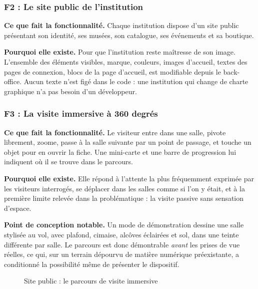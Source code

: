 \subsubsection{F2 : Le site public de l'institution}

\textbf{Ce que fait la fonctionnalité.} Chaque institution dispose d'un site
public présentant son identité, ses musées, son catalogue, ses événements et sa
boutique.

\textbf{Pourquoi elle existe.} Pour que l'institution reste maîtresse de son
image. L'ensemble des éléments visibles, marque, couleurs, images d'accueil,
textes des pages de connexion, blocs de la page d'accueil, est modifiable
depuis le back-office. Aucun texte n'est figé dans le code : une institution qui
change de charte graphique n'a pas besoin d'un développeur.

\subsubsection{F3 : La visite immersive à 360 degrés}

\textbf{Ce que fait la fonctionnalité.} Le visiteur entre dans une salle,
pivote librement, zoome, passe à la salle suivante par un point de passage, et
touche un objet pour en ouvrir la fiche. Une mini-carte et une barre de
progression lui indiquent où il se trouve dans le parcours.

\textbf{Pourquoi elle existe.} Elle répond à l'attente la plus fréquemment
exprimée par les visiteurs interrogés, se déplacer dans les salles comme si
l'on y était, et à la première limite relevée dans la problématique : la visite
passive sans sensation d'espace.

\textbf{Point de conception notable.} Un mode de démonstration dessine une salle
stylisée au vol, avec plafond, cimaise, alcôves éclairées et sol, dans une
teinte différente par salle. Le parcours est donc démontrable \emph{avant} les
prises de vue réelles, ce qui, sur un terrain dépourvu de matière numérique
préexistante, a conditionné la possibilité même de présenter le dispositif.

\begin{figure}[htbp]
\centering
{}
\caption{Site public : le parcours de visite immersive}
\label{fig:cap-tour}
\end{figure}

